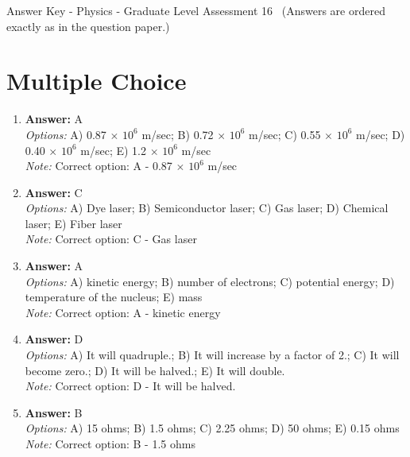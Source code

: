 \documentclass[12pt]{article}
\begin{document}
\begin{center}
Answer Key - Physics - Graduate Level Assessment 16 \
\small (Answers are ordered exactly as in the question paper.)
\end{center}

\section*{Multiple Choice}
\begin{enumerate}[label=\arabic*.]
\item \textbf{Answer:} A
\\ \textit{Options:} A) 0.87 \ensuremath{\times} $10^6$ m/sec; B) 0.72 \ensuremath{\times} $10^6$ m/sec; C) 0.55 \ensuremath{\times} $10^6$ m/sec; D) 0.40 \ensuremath{\times} $10^6$ m/sec; E) 1.2 \ensuremath{\times} $10^6$ m/sec
\\ \textit{Note:} Correct option: A - 0.87 \ensuremath{\times} $10^6$ m/sec
\item \textbf{Answer:} C
\\ \textit{Options:} A) Dye laser; B) Semiconductor laser; C) Gas laser; D) Chemical laser; E) Fiber laser
\\ \textit{Note:} Correct option: C - Gas laser
\item \textbf{Answer:} A
\\ \textit{Options:} A) kinetic energy; B) number of electrons; C) potential energy; D) temperature of the nucleus; E) mass
\\ \textit{Note:} Correct option: A - kinetic energy
\item \textbf{Answer:} D
\\ \textit{Options:} A) It will quadruple.; B) It will increase by a factor of 2.; C) It will become zero.; D) It will be halved.; E) It will double.
\\ \textit{Note:} Correct option: D - It will be halved.
\item \textbf{Answer:} B
\\ \textit{Options:} A) 15 ohms; B) 1.5 ohms; C) 2.25 ohms; D) 50 ohms; E) 0.15 ohms
\\ \textit{Note:} Correct option: B - 1.5 ohms
\end{enumerate}
\end{document}
